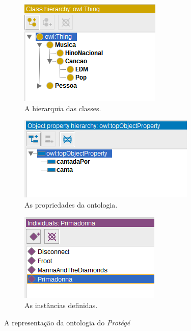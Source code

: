 \begin{figure}[H]
	\centering
	\begin{subfigure}{.3\textwidth}
		\centering
		\includegraphics[width=0.95\linewidth]{Capitulos/Ferramentas/classes}
		\caption{A hierarquia das classes.}
	\end{subfigure}%
	\begin{subfigure}{.475\textwidth}
		\centering
		\includegraphics[width=0.95\linewidth]{Capitulos/Ferramentas/propriedades}
		\caption{As propriedades da ontologia.}
	\end{subfigure}
	\begin{subfigure}{.3\textwidth}
		\centering
		\includegraphics[width=0.95\linewidth]{Capitulos/Ferramentas/individuos}
		\caption{As instâncias definidas.}
	\end{subfigure}
	\caption{A representação da ontologia do \textit{Protégé}}
	\label{img:Representacao}
\end{figure}
 

